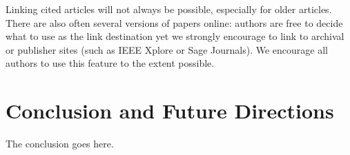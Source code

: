 \documentclass[conference]{IEEEtran}
\begin{document}
Linking cited articles will not always be possible, especially for
older articles. There are also often several versions of papers
online: authors are free to decide what to use as the link destination
yet we strongly encourage to link to archival or publisher sites
(such as IEEE Xplore or Sage Journals).  We encourage all authors to use this feature to
the extent possible.

\section{Conclusion and Future Directions} 
\label{sec:conclusion}

The conclusion goes here.

 



\end{document}
